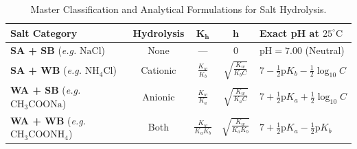 \documentclass[10pt,twoside,openright]{book}
\begin{document}
\begin{table}[htbp]
\centering
\fontsize{7.5pt}{9.5pt}\selectfont
\renewcommand{\arraystretch}{1.2}
\setlength{\tabcolsep}{2.5pt}
\begin{tabularx}{\linewidth}{l c c c Y}
\toprule
\textbf{Salt Category} & \textbf{Hydrolysis} & $\mathbf{K_h}$ & $\mathbf{h}$ & \textbf{Exact pH at } $25^\circ\mathrm{C}$ \\
\midrule
\textbf{SA + SB} (\textit{e.g.} $\mathrm{NaCl}$) & None & --- & $0$ & $\text{pH} = 7.00$ (Neutral) \\
\midrule
\textbf{SA + WB} (\textit{e.g.} $\mathrm{NH_4Cl}$) & Cationic & $\frac{K_w}{K_b}$ & $\sqrt{\frac{K_w}{K_b C}}$ & $7 - \frac{1}{2}\text{p}K_b - \frac{1}{2}\log_{10} C$ \\
\midrule
\textbf{WA + SB} (\textit{e.g.} $\mathrm{CH_3COONa}$) & Anionic & $\frac{K_w}{K_a}$ & $\sqrt{\frac{K_w}{K_a C}}$ & $7 + \frac{1}{2}\text{p}K_a + \frac{1}{2}\log_{10} C$ \\
\midrule
\textbf{WA + WB} (\textit{e.g.} $\mathrm{CH_3COONH_4}$) & Both & $\frac{K_w}{K_a K_b}$ & $\sqrt{\frac{K_w}{K_a K_b}}$ & $7 + \frac{1}{2}\text{p}K_a - \frac{1}{2}\text{p}K_b$ \\
\bottomrule
\end{tabularx}
\caption{Master Classification and Analytical Formulations for Salt Hydrolysis.}
\end{table}
\end{document}

